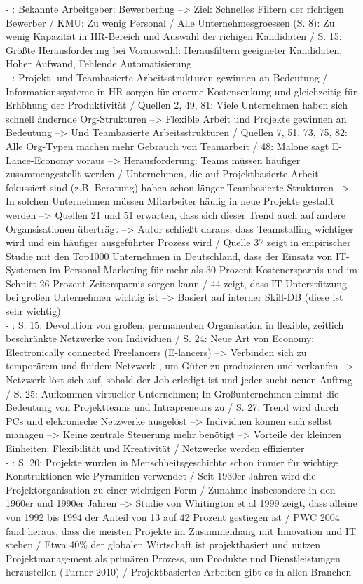 - \cite{hays:2013}: Bekannte Arbeitgeber: Bewerberflug --> Ziel: Schnelles Filtern der richtigen Bewerber / KMU: Zu wenig Personal / Alle Unternehmesgroessen (S. 8): Zu wenig Kapazität in HR-Bereich und Auswahl der richigen Kandidaten / S. 15: Größte Herausforderung bei Vorauswahl: Herausfiltern geeigneter Kandidaten, Hoher Aufwand, Fehlende Automatisierung \\
- \cite{malinowski:2008}: Projekt- und Teambasierte Arbeitsstrukturen gewinnen an Bedeutung / Informationssysteme in HR sorgen für enorme Kostensenkung und gleichzeitig für Erhöhung der Produktivität  / Quellen 2, 49, 81: Viele Unternehmen haben sich schnell ändernde Org-Strukturen --> Flexible Arbeit und Projekte gewinnen an Bedeutung --> Und Teambasierte Arbeitsstrukturen / Quellen 7, 51, 73, 75, 82: Alle Org-Typen machen mehr Gebrauch von Teamarbeit / 48: Malone sagt E-Lance-Economy voraus --> Herausforderung: Teams müssen häufiger zusammengestellt werden / Unternehmen, die auf Projektbasierte Arbeit fokussiert sind (z.B. Beratung) haben schon länger Teambasierte Strukturen --> In solchen Unternehmen müssen Mitarbeiter häufig in neue Projekte gestafft werden --> Quellen 21 und 51 erwarten, dass sich dieser Trend auch auf andere Organsisationen überträgt --> Autor schließt daraus, dass Teamstaffing wichtiger wird und ein häufiger ausgeführter Prozess wird / Quelle 37 zeigt in empirischer Studie mit den Top1000 Unternehmen in Deutschland, dass der Einsatz von IT-Systemen im Personal-Marketing für mehr als 30 Prozent Kostenersparnis und im Schnitt 26 Prozent Zeitersparnis sorgen kann / 44 zeigt, dass IT-Unterstützung bei großen Unternehmen wichtig ist --> Basiert auf interner Skill-DB (diese ist sehr wichtig)\\
- \cite{elanceEconomy:1999}: S. 15: Devolution von großen, permanenten Organisation in flexible, zeitlich beschränkte Netzwerke von Individuen / S. 24: Neue Art von Economy: Electronically connected Freelancers (E-lancers) --> Verbinden sich zu temporärem und fluidem Netzwerk , um Güter zu produzieren und verkaufen --> Netzwerk löst sich auf, sobald der Job erledigt ist und jeder sucht neuen Auftrag / S. 25: Aufkommen virtueller Unternehmen; In Großunternehmen nimmt die Bedeutung von Projektteams und Intrapreneurs zu / S. 27: Trend wird durch PCs und elekronische Netzwerke ausgelöst --> Individuen können sich selbst managen --> Keine zentrale Steuerung mehr benötigt --> Vorteile der kleinren Einheiten: Flexibilität und Kreativität / Netzwerke werden effizienter \\
- \cite{lundin:2015}: S. 20: Projekte wurden in Menschheitsgeschichte schon immer für wichtige Konstruktionen wie Pyramiden verwendet / Seit 1930er Jahren wird die Projektorganisation zu einer wichtigen Form / Zunahme insbesondere in den 1960er und 1990er Jahren --> Studie von Whitington et al 1999 zeigt, dass alleine von 1992 bis 1994 der Anteil von 13 auf 42 Prozent gestiegen ist / PWC 2004 fand heraus, dass die meisten Projekte im Zusammenhang mit Innovation und IT stehen / Etwa 40\% der globalen Wirtschaft ist projektbasiert und nutzen Projektmanagement als primären Prozess, um Produkte und Dienstleistungen herzustellen (Turner 2010) / Projektbasiertes Arbeiten gibt es in allen Branchen \\
